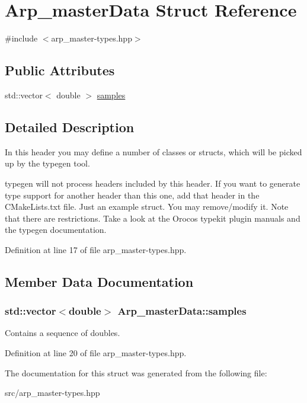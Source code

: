 \hypertarget{structArp__masterData}{
\section{Arp\_\-masterData Struct Reference}
\label{structArp__masterData}
}


{\ttfamily \#include $<$arp\_\-master-\/types.hpp$>$}

\subsection*{Public Attributes}
\begin{DoxyCompactItemize}
\item 
std::vector$<$ double $>$ \hyperlink{structArp__masterData_a1c2b0765dcc23906a024c64a91a0128a}{samples}
\end{DoxyCompactItemize}


\subsection{Detailed Description}
In this header you may define a number of classes or structs, which will be picked up by the typegen tool.

typegen will not process headers included by this header. If you want to generate type support for another header than this one, add that header in the CMakeLists.txt file. Just an example struct. You may remove/modify it. Note that there are restrictions. Take a look at the Orocos typekit plugin manuals and the typegen documentation. 

Definition at line 17 of file arp\_\-master-\/types.hpp.



\subsection{Member Data Documentation}
\hypertarget{structArp__masterData_a1c2b0765dcc23906a024c64a91a0128a}{
\subsubsection[{samples}]{\setlength{\rightskip}{0pt plus 5cm}std::vector$<$double$>$ {\bf Arp\_\-masterData::samples}}}
\label{structArp__masterData_a1c2b0765dcc23906a024c64a91a0128a}
Contains a sequence of doubles. 

Definition at line 20 of file arp\_\-master-\/types.hpp.



The documentation for this struct was generated from the following file:\begin{DoxyCompactItemize}
\item 
src/arp\_\-master-\/types.hpp\end{DoxyCompactItemize}
